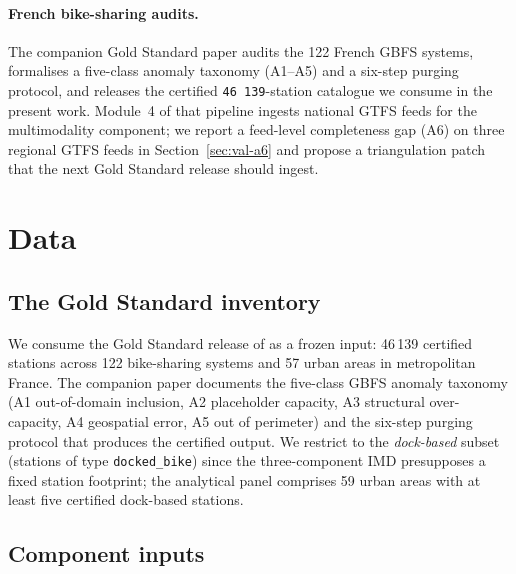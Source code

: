 \documentclass[11pt,a4paper]{article}
\begin{document}
\paragraph{French bike-sharing audits.}
The companion Gold Standard paper \citep{Fosse2026gold} audits
the 122 French GBFS systems, formalises a five-class anomaly
taxonomy (A1--A5) and a six-step purging protocol, and releases
the certified \texttt{46\,139}-station catalogue we consume in
the present work. Module~4 of that pipeline ingests national
GTFS feeds for the multimodality component; we report a
feed-level completeness gap (A6) on three regional GTFS
feeds in Section~\ref{sec:val-a6} and propose a triangulation
patch that the next Gold Standard release should ingest.

\section{Data}
\label{sec:data}

\subsection{The Gold Standard inventory}

We consume the Gold Standard release of \citet{Fosse2026gold}
as a frozen input: 46\,139 certified stations across 122
bike-sharing systems and 57 urban areas in metropolitan France.
The companion paper documents the five-class GBFS anomaly
taxonomy (A1 out-of-domain inclusion, A2 placeholder capacity,
A3 structural over-capacity, A4 geospatial error, A5 out of
perimeter) and the six-step purging protocol that produces the
certified output. We restrict to the \emph{dock-based} subset
(stations of type \texttt{docked\_bike}) since the
three-component IMD presupposes a fixed station footprint; the
analytical panel comprises 59 urban areas with at least five
certified dock-based stations.

\subsection{Component inputs}
\end{document}
